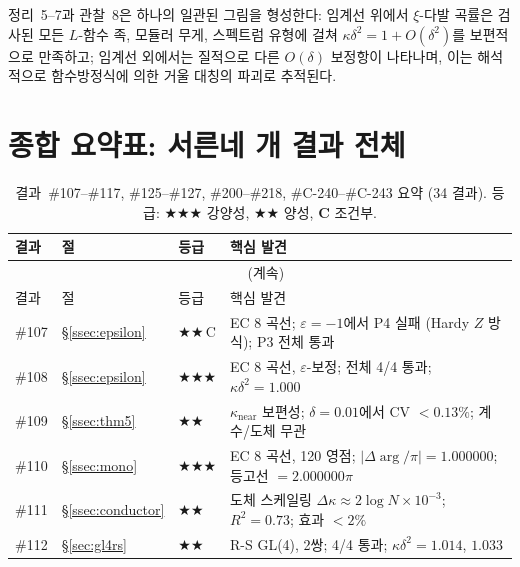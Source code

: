 \documentclass[11pt, a4paper]{article}
\theoremstyle{plain}
\theoremstyle{definition}
\begin{document}
정리~5--7과 관찰~8은 하나의 일관된 그림을 형성한다:
임계선 위에서 $\xi$-다발 곡률은 검사된 모든 $L$-함수 족,
모듈러 무게, 스펙트럼 유형에 걸쳐 $\kappa\delta^{2}=1+O(\delta^{2})$를
보편적으로 만족하고; 임계선 외에서는 질적으로 다른 $O(\delta)$ 보정항이
나타나며, 이는 해석적으로 함수방정식에 의한 거울 대칭의 파괴로 추적된다.


\appendix

\section{종합 요약표: 서른네 개 결과 전체}
\label{app:summary}

\begin{longtable}{lllp{5.5cm}}
\caption{결과~\#107--\#117, \#125--\#127, \#200--\#218, \#C-240--\#C-243 요약 (34 결과). 등급:
  \textbf{$\bigstar\bigstar\bigstar$} 강양성,
  \textbf{$\bigstar\bigstar$} 양성, \textbf{C} 조건부.}
\label{tab:summary}\\
\toprule
결과 & 절 & 등급 & 핵심 발견 \\
\midrule
\endfirsthead
\multicolumn{4}{c}{\tablename~\thetable{} (계속)}\\
\toprule
결과 & 절 & 등급 & 핵심 발견 \\
\midrule
\endhead
\bottomrule
\endfoot
\#107 & \S\ref{ssec:epsilon}      & \textbf{$\bigstar\bigstar$}\,C  & EC 8 곡선; $\varepsilon=-1$에서 P4 실패 (Hardy $Z$ 방식); P3 전체 통과 \\
\#108 & \S\ref{ssec:epsilon}      & \textbf{$\bigstar\bigstar\bigstar$}    & EC 8 곡선, $\varepsilon$-보정; 전체 4/4 통과; $\kappa\delta^{2}=1.000$ \\
\#109 & \S\ref{ssec:thm5}         & \textbf{$\bigstar\bigstar$}     & $\kappa_{\text{near}}$ 보편성; $\delta=0.01$에서 CV $<0.13\%$; 계수/도체 무관 \\
\#110 & \S\ref{ssec:mono}         & \textbf{$\bigstar\bigstar\bigstar$}    & EC 8 곡선, 120 영점; $|\Delta\!\arg/\pi|=1.000000$; 등고선 $=2.000000\pi$ \\
\#111 & \S\ref{ssec:conductor}    & \textbf{$\bigstar\bigstar$}     & 도체 스케일링 $\Delta\kappa\approx 2\log N\times 10^{-3}$; $R^{2}=0.73$; 효과 $<2\%$ \\
\#112 & \S\ref{sec:gl4rs}         & \textbf{$\bigstar\bigstar$}     & R-S GL(4), 2쌍; 4/4 통과; $\kappa\delta^{2}=1.014$, $1.033$ \\

\end{longtable}
\end{document}
